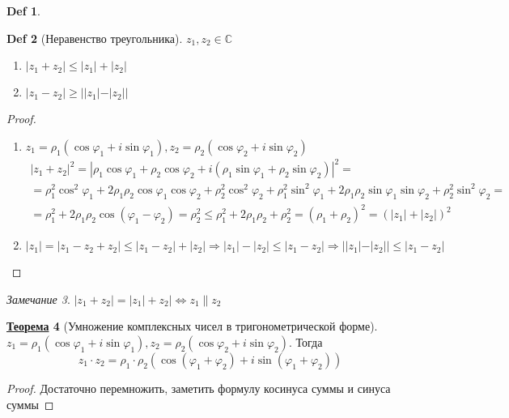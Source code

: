 \documentclass[12pt]{article}
\newenvironment{MyList}[1][4pt]{
  \begin{enumerate}[1.]
  \setlength{\parskip}{0pt}
  \setlength{\itemsep}{#1}
}{       
  \end{enumerate}
}
\def\C{\mathbb{C}}       %
\def\PHI{\varphi}        %
\def\SO{\Rightarrow}     %
\def\EQ{\Leftrightarrow} %
\def\Pagebreak{\pagebreak\vspace*{-1.5em}}
\theoremstyle{definition} %
\newtheorem{Thm}{\underline{Теорема}}[subsection] %
\theoremstyle{plain} %
\newtheorem{Def}[Thm]{Def} %
\theoremstyle{remark} %
\newtheorem{Rem}[Thm]{Замечание} %
\begin{document}
{\begin{Def}
\end{Def} 

\begin{Def}[Неравенство треугольника]
    $z_1, z_2 \in \C$
    \begin{MyList}
        \item $|z_1 + z_2| \leqslant |z_1| + |z_2|$
        \item $|z_1 - z_2| \geqslant ||z_1| - |z_2||$  
    \end{MyList} 
\end{Def}

\begin{proof}
    \begin{MyList}
        \item $z_1 = \rho_1(\cos \PHI_1 + i\sin \PHI_1), z_2 = \rho_2(\cos \PHI_2 + i\sin \PHI_2)$ \\
        \begin{gather*}
            |z_1 + z_2|^2 = |\rho_1 \cos \PHI_1 + \rho_2 \cos \PHI_2 + i(\rho_1 \sin \PHI_1 + \rho_2 \sin \PHI_2)|^2 = \\
            = \rho_1^2 \cos^2 \PHI_1 + 2 \rho_1 \rho_2 \cos \PHI_1 \cos \PHI_2 + \rho_2^2 \cos^2 \PHI_2 + \rho_1^2 \sin^2 \PHI_1 + 2 \rho_1 \rho_2 \sin \PHI_1 \sin \PHI_2 + \rho_2^2 \sin^2 \PHI_2 = \\
            = \rho_1^2 + 2\rho_1 \rho_2 \cos(\PHI_1 - \PHI_2) = \rho_2^2 \leqslant \rho_1^2 + 2\rho_1 \rho_2 + \rho_2^2 = (\rho_1 + \rho_2)^2 = (|z_1| + |z_2|)^2
        \end{gather*}

        \item \[
            |z_1| = |z_1 - z_2 + z_2| \leqslant |z_1 - z_2| + |z_2| \SO |z_1| - |z_2| \leqslant |z_1 - z_2| \SO ||z_1| - |z_2|| \leqslant |z_1 - z_2|
        \]
    \end{MyList}
\end{proof}

\begin{Rem}
    $|z_1 + z_2| = |z_1| + z_2| \EQ z_1 \parallel z_2$ 
\end{Rem}

\Pagebreak
\begin{Thm}[Умножение комплексных чисел в тригонометрической форме]
    $z_1 = \rho_1 (\cos \PHI_1 + i\sin \PHI_1), z_2 = \rho_2 (\cos \PHI_2 + i\sin \PHI_2)$. Тогда 
    \[z_1 \cdot z_2 = \rho_1 \cdot \rho_2 (\cos (\PHI_1 + \PHI_2) + i\sin (\PHI_1 + \PHI_2))\] 
\end{Thm}

\begin{proof}
    Достаточно перемножить, заметить формулу косинуса суммы и синуса суммы
\end{proof}

}
\end{document}
